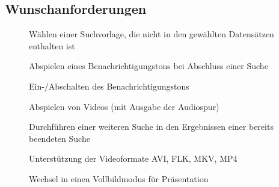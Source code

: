 \subsection{Wunschanforderungen}
\begin{description}
	\item[] Wählen einer Suchvorlage, die nicht in den gewählten Datensätzen enthalten ist
	\newline
	\item[] Abspielen eines Benachrichtigungstons bei Abschluss einer Suche
	\item[] Ein-/Abschalten des Benachrichtigungstons
	\item[] Abspielen von Videos (mit Ausgabe der Audiospur)
	\item[] Durchführen einer weiteren Suche in den Ergebnissen einer bereits beendeten Suche
	\newline
	\item[] Unterstützung der Videoformate AVI, FLK, MKV, MP4
	\item[] Wechsel in einen Vollbildmodus für Präsentation
\end{description}
